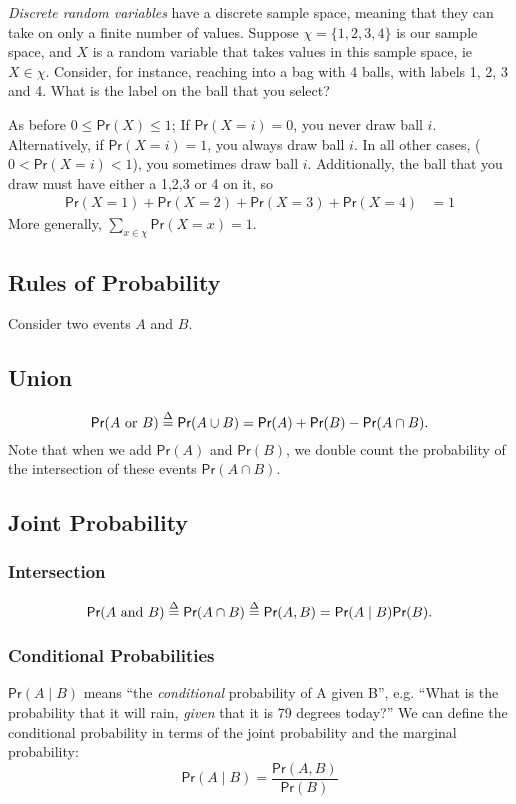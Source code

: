 \documentclass[twoside]{article}
\def\defn{\stackrel{\Delta}{=}} %
\def\Pr{\textsf{Pr}} %
\def\tn#1{\textnormal{#1}} %
\begin{document}
\emph{Discrete random variables} have a discrete sample space, meaning that they can take on only a finite number of values. Suppose $\chi = \lbrace 1, 2, 3,4 \rbrace$ is our sample space, and $X$ is a random variable that takes values in this sample space, ie $X \in \chi$. Consider, for instance, reaching into a bag with 4 balls, with labels 1, 2, 3 and 4. What is the label on the ball that you select?

As before $0 \leq \Pr(X) \leq 1$; If $\Pr(X=i)=0$, you never draw ball $i$. Alternatively, if $\Pr(X=i)= 1$, you always draw ball $i$. In all other cases, ($0 < \Pr(X=i) < 1$),  you sometimes draw ball $i$. Additionally, the ball that you draw must have either a 1,2,3 or 4 on it, so 
\begin{align*}
\Pr(X=1) + \Pr(X=2) + \Pr(X=3) + \Pr(X=4) & = 1
\end{align*}
More generally, $\sum_{x \in \chi} \Pr(X=x) =1 $.

\subsection{Rules of Probability} 
Consider two events $A$ and $B$. 

\subsection*{Union}
\[
\Pr(A \tn{ or } B) \defn \Pr( A \cup B) = \Pr(A) + \Pr(B) - \Pr(A \cap B).
\]
Note that when we add $\Pr(A)$ and $\Pr(B)$, we double count the probability of the intersection of these events $\Pr(A \cap B)$. 

\subsection*{Joint Probability}
\subsubsection*{Intersection}
\[ 
\Pr(A \tn{ and } B) \defn \Pr( A \cap B) \defn \Pr(A , B) = \Pr(A \mid B)\Pr(B).
\]

\subsubsection*{Conditional Probabilities}
$\Pr(A \mid B)$ means ``the \emph{conditional} probability of A given B'', e.g. ``What is the probability that it will rain, \emph{given} that it is 79 degrees today?'' We can define the conditional probability in terms of the joint probability and the marginal probability:
\[
\Pr(A\mid B) = \frac {\Pr(A,B)}{\Pr(B)}
\]
\end{document}
